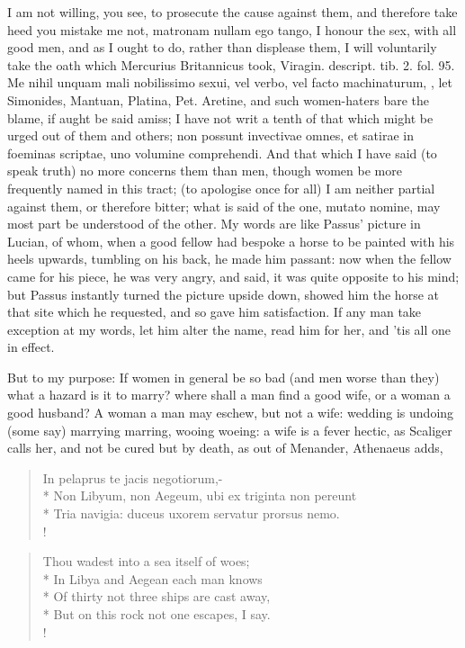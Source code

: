 I am not willing, you see, to prosecute the cause against them, and
therefore take heed you mistake me not, matronam nullam ego
tango, I honour the sex, with all good men, and as I ought to do,
rather than displease them, I will voluntarily take the oath which
Mercurius Britannicus took, Viragin. descript. tib. 2. fol. 95. Me
nihil unquam mali nobilissimo sexui, vel verbo, vel facto machinaturum,
\etc{}, let Simonides, Mantuan, Platina, Pet. Aretine, and such
women-haters bare the blame, if aught be said amiss; I have not writ a
tenth of that which might be urged out of them and others; non
possunt invectivae omnes, et satirae in foeminas scriptae, uno volumine
comprehendi. And that which I have said (to speak truth) no more
concerns them than men, though women be more frequently named in this
tract; (to apologise once for all) I am neither partial against them,
or therefore bitter; what is said of the one, mutato nomine, may most
part be understood of the other. My words are like Passus' picture in
Lucian, of whom, when a good fellow had bespoke a horse to be
painted with his heels upwards, tumbling on his back, he made him
passant: now when the fellow came for his piece, he was very angry, and
said, it was quite opposite to his mind; but Passus instantly turned
the picture upside down, showed him the horse at that site which he
requested, and so gave him satisfaction. If any man take exception at
my words, let him alter the name, read him for her, and 'tis all one in
effect.

But to my purpose: If women in general be so bad (and men worse than
they) what a hazard is it to marry? where shall a man find a good wife,
or a woman a good husband? A woman a man may eschew, but not a wife:
wedding is undoing (some say) marrying marring, wooing woeing: a
wife is a fever hectic, as Scaliger calls her, and not be cured but by
death, as out of Menander, Athenaeus adds,
%
\begin{latin}%
\begin{verse}%
In pelaprus te jacis negotiorum,-\\*
Non Libyum, non Aegeum, ubi ex triginta non pereunt\\*
Tria navigia: duceus uxorem servatur prorsus nemo.\\!
\end{verse}%
\end{latin}%
\translationrule%
\begin{verse}%
Thou wadest into a sea itself of woes;\\*
In Libya and Aegean each man knows\\*
Of thirty not three ships are cast away,\\*
But on this rock not one escapes, I say.\\!
\end{verse}%

